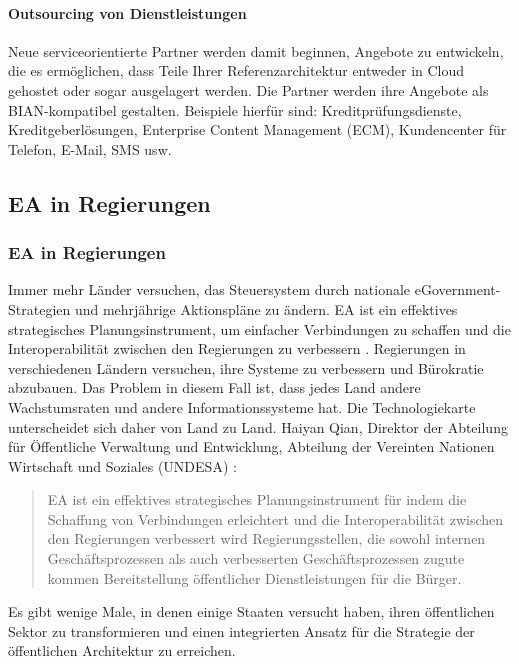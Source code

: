 \documentclass[
	doc,
	a4paper,
	helv
	]{apa6}
\begin{document}
\paragraph{Outsourcing von Dienstleistungen}
Neue serviceorientierte Partner werden damit beginnen, Angebote zu entwickeln, die es ermöglichen, dass Teile Ihrer Referenzarchitektur entweder in Cloud gehostet oder sogar ausgelagert werden. Die Partner werden ihre Angebote als BIAN-kompatibel gestalten. Beispiele hierfür sind: Kreditprüfungsdienste, 
Kreditgeberlösungen, Enterprise Content Management (ECM), Kundencenter für Telefon, E-Mail, SMS usw.

\subsection{EA in Regierungen}
\subsubsection{EA in Regierungen}
Immer mehr Länder versuchen, das Steuersystem durch nationale eGovernment-Strategien und mehrjährige Aktionspläne zu ändern. EA ist ein effektives strategisches Planungsinstrument, um  einfacher Verbindungen zu schaffen und die Interoperabilität zwischen den Regierungen zu verbessern \autocite{Bakar2016}. Regierungen in verschiedenen Ländern versuchen, ihre Systeme zu verbessern und Bürokratie abzubauen. Das Problem in diesem Fall ist, dass jedes Land andere Wachstumsraten und andere Informationssysteme hat. Die Technologiekarte unterscheidet sich daher von Land zu Land. Haiyan Qian, Direktor der Abteilung für Öffentliche Verwaltung und Entwicklung, Abteilung der Vereinten Nationen Wirtschaft und Soziales (UNDESA) :
\begin{quote}
\glqq EA ist ein effektives strategisches Planungsinstrument für indem die Schaffung von Verbindungen erleichtert und die Interoperabilität zwischen den Regierungen verbessert wird Regierungsstellen, die sowohl internen Geschäftsprozessen als auch verbesserten Geschäftsprozessen zugute kommen Bereitstellung öffentlicher Dienstleistungen für die Bürger.\grqq
\autocite{Pallab2010}
\end{quote}
Es gibt wenige Male, in denen einige Staaten versucht haben, ihren öffentlichen Sektor zu transformieren und einen integrierten Ansatz für die Strategie der öffentlichen Architektur zu erreichen.
\end{document}
